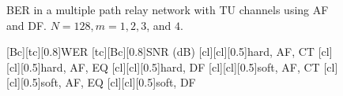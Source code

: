 \begin{figure}
{}
\caption{BER in a multiple path relay network with TU channels using AF and DF.  $N = 128, m = 1, 2, 3$, and $4$.}
\label{fig:mp_af_df_ber_plots_TU}
\end{figure}

\begin{figure}
    [Bc][tc][0.8]{WER}
    [tc][Bc][0.8]{SNR (dB)}
    [cl][cl][0.5]{hard, AF, CT}
    [cl][cl][0.5]{hard, AF, EQ}
    [cl][cl][0.5]{hard, DF}
    [cl][cl][0.5]{soft, AF, CT}
    [cl][cl][0.5]{soft, AF, EQ}
    [cl][cl][0.5]{soft, DF}

\centerline{
	 \\
}
\centerline{
}
\end{figure}
